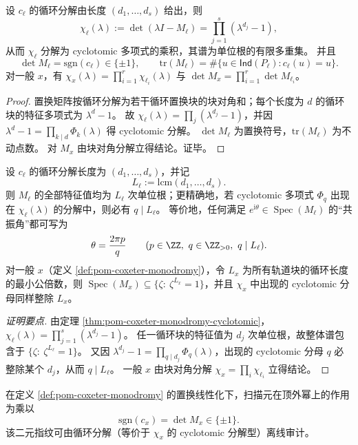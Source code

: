 \begin{theorem}\label{thm:pom-coxeter-monodromy-cyclotomic}
设 \(c_\ell\) 的循环分解由长度 \((d_1,\dots,d_s)\) 给出，则
\[
\chi_\ell(\lambda):=\det(\lambda I-M_\ell)=\prod_{j=1}^s (\lambda^{d_j}-1),
\]
从而 \(\chi_\ell\) 分解为 cyclotomic 多项式的乘积，其谱为单位根的有限多重集。
并且
\[
\det M_\ell=\mathrm{sgn}(c_\ell)\in\{\pm 1\},\qquad
\mathrm{tr}(M_\ell)=\#\{u\in \mathsf{Ind}(P_\ell): c_\ell(u)=u\}.
\]
对一般 \(x\)，有 \(\chi_x(\lambda)=\prod_{i=1}^r \chi_{\ell_i}(\lambda)\) 与 \(\det M_x=\prod_{i=1}^r \det M_{\ell_i}\)。
\end{theorem}
\begin{proof}
置换矩阵按循环分解为若干循环置换块的块对角和；每个长度为 \(d\) 的循环块的特征多项式为 \(\lambda^d-1\)。
故 \(\chi_\ell(\lambda)=\prod_j(\lambda^{d_j}-1)\)，并因 \(\lambda^d-1=\prod_{k\mid d}\Phi_k(\lambda)\) 得 cyclotomic 分解。
\(\det M_\ell\) 为置换符号，\(\mathrm{tr}(M_\ell)\) 为不动点数。
对 \(M_x\) 由块对角分解立得结论。证毕。
\end{proof}

\begin{corollary}\label{cor:pom-coxeter-monodromy-lcm-quantization}
设 \(c_\ell\) 的循环分解长度为 \((d_1,\dots,d_s)\)，并记
\[
L_\ell:=\mathrm{lcm}(d_1,\dots,d_s).
\]
则 \(M_\ell\) 的全部特征值均为 \(L_\ell\) 次单位根；更精确地，若 cyclotomic 多项式 \(\Phi_q\) 出现在 \(\chi_\ell(\lambda)\) 的分解中，则必有 \(q\mid L_\ell\)。
等价地，任何满足 \(e^{\mathrm{i}\theta}\in\operatorname{Spec}(M_\ell)\) 的“共振角”都可写为
\[
\theta=\frac{2\pi p}{q}\qquad(p\in\ZZ,\ q\in\ZZ_{>0},\ q\mid L_\ell).
\]
对一般 \(x\)（定义 \ref{def:pom-coxeter-monodromy}），令 \(L_x\) 为所有轨道块的循环长度的最小公倍数，则 \(\operatorname{Spec}(M_x)\subseteq\{\zeta:\ \zeta^{L_x}=1\}\)，并且 \(\chi_x\) 中出现的 cyclotomic 分母同样整除 \(L_x\)。
\end{corollary}
\begin{proof}[证明要点]
由定理 \ref{thm:pom-coxeter-monodromy-cyclotomic}，\(\chi_\ell(\lambda)=\prod_{j=1}^s(\lambda^{d_j}-1)\)。
任一循环块的特征值为 \(d_j\) 次单位根，故整体谱包含于 \(\{\zeta:\ \zeta^{L_\ell}=1\}\)。
又因 \(\lambda^{d_j}-1=\prod_{q\mid d_j}\Phi_q(\lambda)\)，出现的 cyclotomic 分母 \(q\) 必整除某个 \(d_j\)，从而 \(q\mid L_\ell\)。
一般 \(x\) 由块对角分解 \(\chi_x=\prod_i\chi_{\ell_i}\) 立得结论。
\end{proof}

\begin{corollary}\label{cor:pom-coxeter-top-sign}
在定义 \ref{def:pom-coxeter-monodromy} 的置换线性化下，扫描元在顶外幂上的作用为乘以
\[
\mathrm{sgn}(c_x)=\det M_x\in\{\pm 1\}.
\]
该二元指纹可由循环分解（等价于 \(\chi_x\) 的 cyclotomic 分解型）离线审计。
\end{corollary}

